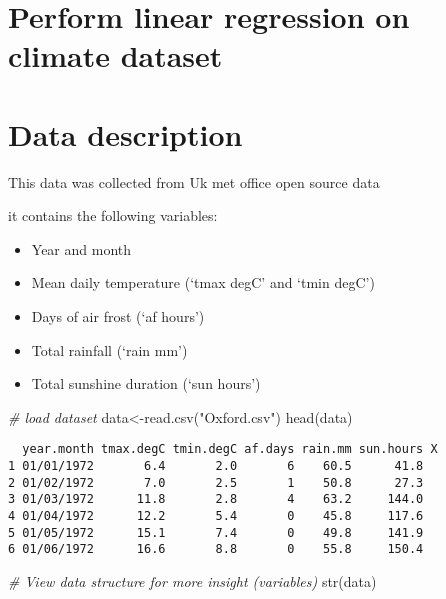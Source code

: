 \documentclass[
]{article}
\author{}
\date{\vspace{-2.5em}}
\newenvironment{Shaded}{\begin{snugshade}}{\end{snugshade}}
\newcommand{\CommentTok}[1]{\textcolor[rgb]{0.56,0.35,0.01}{\textit{#1}}}
\newcommand{\FunctionTok}[1]{\textcolor[rgb]{0.00,0.00,0.00}{#1}}
\newcommand{\NormalTok}[1]{#1}
\newcommand{\OtherTok}[1]{\textcolor[rgb]{0.56,0.35,0.01}{#1}}
\newcommand{\StringTok}[1]{\textcolor[rgb]{0.31,0.60,0.02}{#1}}
\begin{document}
\hypertarget{perform-linear-regression-on-climate-dataset}{%
\section{Perform linear regression on climate
dataset}\label{perform-linear-regression-on-climate-dataset}}

\hypertarget{data-description}{%
\section{Data description}\label{data-description}}

This data was collected from Uk met office open source data

it contains the following variables:

\begin{itemize}
\item
  Year and month
\item
  Mean daily temperature (`tmax degC' and `tmin degC')
\item
  Days of air frost (`af hours')
\item
  Total rainfall (`rain mm')
\item
  Total sunshine duration (`sun hours')
\end{itemize}

\begin{Shaded}
\begin{Highlighting}[]
\CommentTok{\# load dataset}
\NormalTok{data}\OtherTok{\textless{}{-}}\FunctionTok{read.csv}\NormalTok{(}\StringTok{"Oxford.csv"}\NormalTok{)}
\FunctionTok{head}\NormalTok{(data)}
\end{Highlighting}
\end{Shaded}

\begin{verbatim}
  year.month tmax.degC tmin.degC af.days rain.mm sun.hours X
1 01/01/1972       6.4       2.0       6    60.5      41.8  
2 01/02/1972       7.0       2.5       1    50.8      27.3  
3 01/03/1972      11.8       2.8       4    63.2     144.0  
4 01/04/1972      12.2       5.4       0    45.8     117.6  
5 01/05/1972      15.1       7.4       0    49.8     141.9  
6 01/06/1972      16.6       8.8       0    55.8     150.4  
\end{verbatim}

\begin{Shaded}
\begin{Highlighting}[]
\CommentTok{\# View data structure for more insight (variables)}
\FunctionTok{str}\NormalTok{(data)}
\end{Highlighting}
\end{Shaded}
\end{document}
